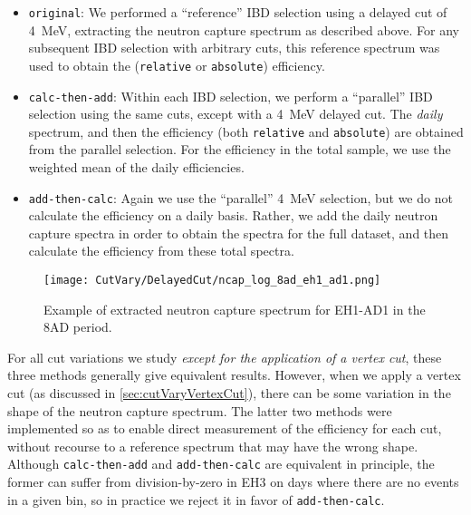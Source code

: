 \documentclass[../thesis.tex]{subfiles}
\begin{document}
\begin{itemize}
\item \texttt{original}: We performed a ``reference'' IBD selection using a delayed cut of 4~MeV, extracting the neutron capture spectrum as described above. For any subsequent IBD selection with arbitrary cuts, this reference spectrum was used to obtain the (\texttt{relative} or \texttt{absolute}) efficiency.
\item \texttt{calc-then-add}: Within each IBD selection, we perform a ``parallel'' IBD selection using the same cuts, except with a 4~MeV delayed cut. The \emph{daily} spectrum, and then the efficiency (both \texttt{relative} and \texttt{absolute}) are obtained from the parallel selection. For the efficiency in the total sample, we use the weighted mean of the daily efficiencies.
\item \texttt{add-then-calc}: Again we use the ``parallel'' 4~MeV selection, but we do not calculate the efficiency on a daily basis. Rather, we add the daily neutron capture spectra in order to obtain the spectra for the full dataset, and then calculate the efficiency from these total spectra.
\end{itemize}

\begin{figure}[ht]
  \texttt{[image: CutVary/DelayedCut/ncap\_log\_8ad\_eh1\_ad1.png]}
  \caption{Example of extracted neutron capture spectrum for EH1-AD1 in the 8AD period.}
  \label{fig:cutVaryDelCutNcapExample}
\end{figure}

For all cut variations we study \emph{except for the application of a vertex cut}, these three methods generally give equivalent results. However, when we apply a vertex cut (as discussed in \autoref{sec:cutVaryVertexCut}), there can be some variation in the shape of the neutron capture spectrum. The latter two methods were implemented so as to enable direct measurement of the efficiency for each cut, without recourse to a reference spectrum that may have the wrong shape. Although \texttt{calc-then-add} and \texttt{add-then-calc} are equivalent in principle, the former can suffer from division-by-zero in EH3 on days where there are no events in a given bin, so in practice we reject it in favor of \texttt{add-then-calc}.

\begin{comment}
In most of the results that follow, we show the outcome of using the \texttt{original} method, but the other methods give the same results. When we later discuss the application of vertex cuts, we will switch to the \texttt{add-then-calc} method (and will show the difficulties that result when attempting to use the \texttt{original} method).
\end{comment}
\end{document}
